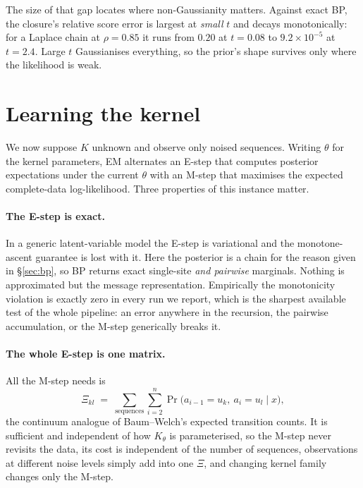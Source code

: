 \documentclass{article}
\begin{document}
The size of that gap locates where non-Gaussianity matters. Against exact BP, the closure's
relative score error is largest at \emph{small} $t$ and decays monotonically: for a Laplace
chain at $\rho=0.85$ it runs from $0.20$ at $t=0.08$ to $9.2\times10^{-5}$ at $t=2.4$. Large
$t$ Gaussianises everything, so the prior's shape survives only where the likelihood is weak.

\section{Learning the kernel}
\label{sec:em}

We now suppose $K$ unknown and observe only noised sequences. Writing $\theta$ for the kernel
parameters, EM alternates an E-step that computes posterior expectations under the current
$\theta$ with an M-step that maximises the expected complete-data log-likelihood. Three
properties of this instance matter.

\paragraph{The E-step is exact.} In a generic latent-variable model the E-step is variational
and the monotone-ascent guarantee is lost with it. Here the posterior is a chain for the
reason given in \S\ref{sec:bp}, so BP returns exact single-site \emph{and pairwise}
marginals. Nothing is approximated but the message representation. Empirically the
monotonicity violation is exactly zero in every run we report, which is the sharpest
available test of the whole pipeline: an error anywhere in the recursion, the pairwise
accumulation, or the M-step generically breaks it.

\paragraph{The whole E-step is one matrix.} All the M-step needs is
\begin{equation}
\Xi_{kl} \;=\; \sum_{\text{sequences}} \sum_{i=2}^{n}
\Pr\big(a_{i-1} = u_k,\ a_i = u_l \mid x\big),
\end{equation}
the continuum analogue of Baum--Welch's expected transition counts. It is sufficient and
independent of how $K_\theta$ is parameterised, so the M-step never revisits the data, its
cost is independent of the number of sequences, observations at different noise levels simply
add into one $\Xi$, and changing kernel family changes only the M-step.
\end{document}

